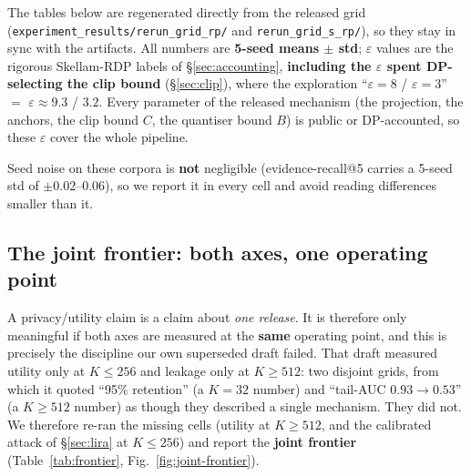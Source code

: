 \documentclass[pdflatex,sn-mathphys-num,iicol]{sn-jnl}
\theoremstyle{thmstyleone}%
\theoremstyle{thmstyletwo}%
\theoremstyle{thmstylethree}%
\newcommand{\eps}{\varepsilon}
\newcommand{\secref}[1]{\S\ref{#1}}
\begin{document}
The tables below are regenerated directly from the released grid
(\texttt{experiment\_results/rerun\_grid\_rp/} and \texttt{rerun\_grid\_s\_rp/}), so they
stay in sync with the artifacts. All numbers are \textbf{5-seed means $\pm$ std};
$\eps$ values are the rigorous Skellam-RDP labels of \secref{sec:accounting},
\textbf{including the $\eps$ spent DP-selecting the clip bound} (\secref{sec:clip}), where
the exploration ``$\eps = 8$ / $\eps = 3$'' $=$ $\eps \approx 9.3$ / $3.2$. Every
parameter of the released mechanism (the projection, the anchors, the clip bound $C$,
the quantiser bound $B$) is public or DP-accounted, so these $\eps$ cover the whole
pipeline.

Seed noise on these corpora is \textbf{not} negligible (evidence-recall@5 carries a
5-seed std of $\pm 0.02$--$0.06$), so we report it in every cell and avoid reading
differences smaller than it.

\subsection{The joint frontier: both axes, one operating point}\label{sec:frontier}

A privacy/utility claim is a claim about \emph{one release}. It is therefore only
meaningful if both axes are measured at the \textbf{same} operating point, and this
is precisely the discipline our own superseded draft failed. That draft measured
utility only at $K \leq 256$ and leakage only at $K \geq 512$: two disjoint grids, from
which it quoted ``95\% retention'' (a $K = 32$ number) and ``tail-AUC $0.93 \to 0.53$''
(a $K \geq 512$ number) as though they described a single mechanism. They did not. We
therefore re-ran the missing cells (utility at $K \geq 512$, and the calibrated attack
of \secref{sec:lira} at $K \leq 256$) and report the \textbf{joint frontier}
(Table~\ref{tab:frontier}, Fig.~\ref{fig:joint-frontier}).
\end{document}
